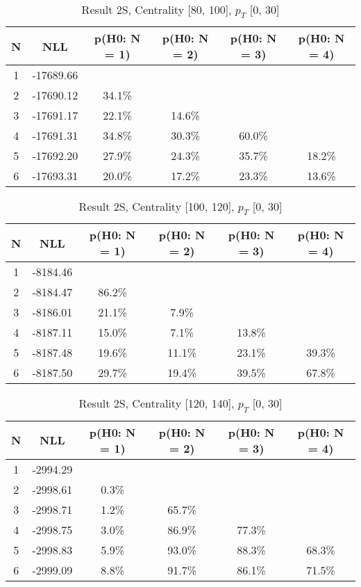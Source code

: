 \begin{table}[htb]
	\begin{center}
	\caption{Result 2S, Centrality [80, 100], $p_{T}$ [0, 30]
}
{\footnotesize\renewcommand{\arraystretch}{1.4}
		\begin{tabular}{cc||cccc}
			N & NLL & p(H0: N = 1) & p(H0: N = 2) & p(H0: N = 3) & p(H0: N = 4)\\ 
		\hline
1 & -17689.66 & & & & \\
2 & -17690.12 & 34.1\% & & & \\
3 & -17691.17 & 22.1\% & 14.6\% & & \\
4 & -17691.31 & 34.8\% & 30.3\% & 60.0\% & \\
5 & -17692.20 & 27.9\% & 24.3\% & 35.7\% & 18.2\% \\
6 & -17693.31 & 20.0\% & 17.2\% & 23.3\% & 13.6\% \\
	\end{tabular}
		\label{tab:lab}
	}
	\end{center}\end{table}

\begin{table}[htb]
	\begin{center}
	\caption{Result 2S, Centrality [100, 120], $p_{T}$ [0, 30]
}
{\footnotesize\renewcommand{\arraystretch}{1.4}
		\begin{tabular}{cc||cccc}
			N & NLL & p(H0: N = 1) & p(H0: N = 2) & p(H0: N = 3) & p(H0: N = 4)\\ 
		\hline
1 & -8184.46 & & & & \\
2 & -8184.47 & 86.2\% & & & \\
3 & -8186.01 & 21.1\% & 7.9\% & & \\
4 & -8187.11 & 15.0\% & 7.1\% & 13.8\% & \\
5 & -8187.48 & 19.6\% & 11.1\% & 23.1\% & 39.3\% \\
6 & -8187.50 & 29.7\% & 19.4\% & 39.5\% & 67.8\% \\
	\end{tabular}
		\label{tab:lab}
	}
	\end{center}\end{table}

\begin{table}[htb]
	\begin{center}
	\caption{Result 2S, Centrality [120, 140], $p_{T}$ [0, 30]
}
{\footnotesize\renewcommand{\arraystretch}{1.4}
		\begin{tabular}{cc||cccc}
			N & NLL & p(H0: N = 1) & p(H0: N = 2) & p(H0: N = 3) & p(H0: N = 4)\\ 
		\hline
1 & -2994.29 & & & & \\
2 & -2998.61 & 0.3\% & & & \\
3 & -2998.71 & 1.2\% & 65.7\% & & \\
4 & -2998.75 & 3.0\% & 86.9\% & 77.3\% & \\
5 & -2998.83 & 5.9\% & 93.0\% & 88.3\% & 68.3\% \\
6 & -2999.09 & 8.8\% & 91.7\% & 86.1\% & 71.5\% \\
	\end{tabular}
		\label{tab:lab}
	}
	\end{center}\end{table}

